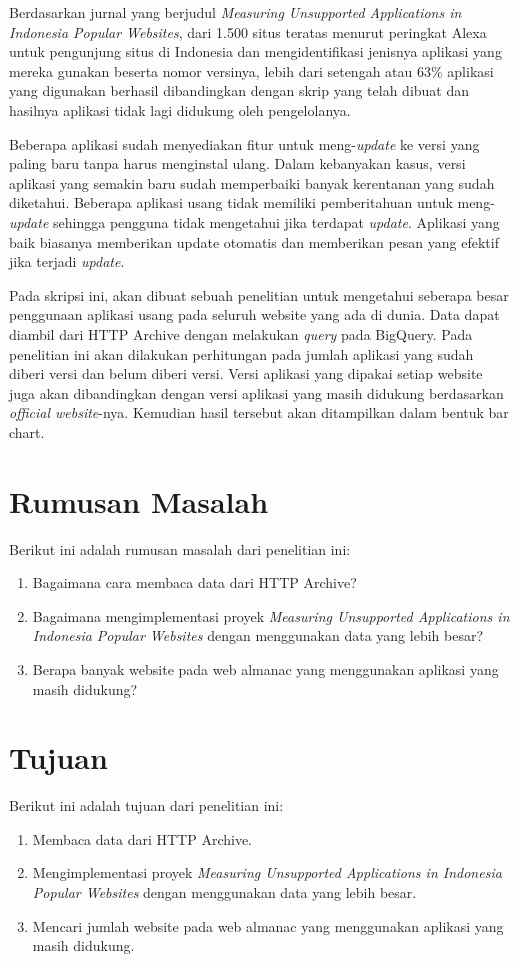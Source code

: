 \documentclass[a4paper,twoside]{article}
\begin{document}
	Berdasarkan jurnal yang berjudul \textit{Measuring Unsupported Applications in Indonesia Popular Websites}, dari 1.500 situs teratas menurut peringkat Alexa untuk pengunjung situs di Indonesia dan mengidentifikasi jenisnya aplikasi yang mereka gunakan beserta nomor versinya, lebih dari setengah atau 63\% aplikasi yang digunakan berhasil dibandingkan dengan skrip yang telah dibuat dan hasilnya aplikasi tidak lagi didukung oleh pengelolanya.
	
	Beberapa aplikasi sudah menyediakan fitur untuk meng-\textit{update} ke versi yang paling baru tanpa harus menginstal ulang. Dalam kebanyakan kasus, versi aplikasi yang semakin baru sudah memperbaiki banyak kerentanan yang sudah diketahui. Beberapa aplikasi usang tidak memiliki pemberitahuan untuk meng-\textit{update} sehingga pengguna tidak mengetahui jika terdapat \textit{update}. Aplikasi yang baik biasanya memberikan update otomatis dan memberikan pesan yang efektif jika terjadi \textit{update}. 
	
	Pada skripsi ini, akan dibuat sebuah penelitian untuk mengetahui seberapa besar penggunaan aplikasi usang pada seluruh website yang ada di dunia. Data dapat diambil dari HTTP Archive dengan melakukan \textit{query} pada BigQuery. Pada penelitian ini akan dilakukan perhitungan pada jumlah aplikasi yang sudah diberi versi dan belum diberi versi. Versi aplikasi yang dipakai setiap website juga akan dibandingkan dengan versi aplikasi yang masih didukung berdasarkan \textit{official website}-nya. Kemudian hasil tersebut akan ditampilkan dalam bentuk bar chart.
	
	\section{Rumusan Masalah}
	Berikut ini adalah rumusan masalah dari penelitian ini:
	\begin{enumerate}
		\item Bagaimana cara membaca data dari HTTP Archive?
		\item Bagaimana mengimplementasi proyek \textit{Measuring Unsupported Applications in Indonesia Popular Websites} dengan menggunakan data yang lebih besar?
		\item Berapa banyak website pada web almanac yang menggunakan aplikasi  yang masih didukung?
	\end{enumerate}
	
	\section{Tujuan}
	Berikut ini adalah tujuan dari penelitian ini:
	\begin{enumerate}
		\item Membaca data dari HTTP Archive.
		\item Mengimplementasi proyek \textit{Measuring Unsupported Applications in Indonesia Popular Websites} dengan menggunakan data yang lebih besar.
		\item Mencari jumlah website pada web almanac yang menggunakan aplikasi yang masih didukung.
	\end{enumerate}
	
\end{document}
